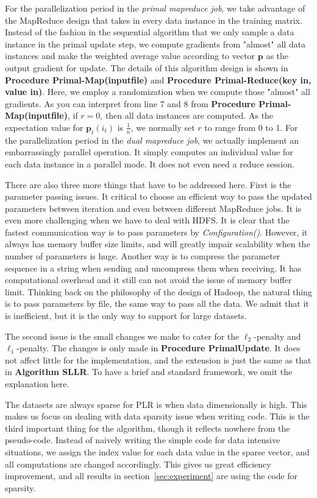 \documentclass{llncs}
\newcommand{\bp}{\mathbf{p}}
\begin{document}
For the parallelization period in the \textit{primal mapreduce job}, we take advantage of the MapReduce design that takes in every data instance in the training matrix.
Instead of the fashion in the sequential algorithm that we only sample a data instance in the primal update step, we compute gradients from "almost" all data instances and make the weighted average value according to vector $\bp$ as the output gradient for update.
The details of this algorithm design is shown in \textbf{Procedure Primal-Map(inputfile)} and \textbf{Procedure Primal-Reduce(key in, value in)}.
Here, we employ a randomization when we compute those "almost" all gradients.
As you can interpret from line 7 and 8 from \textbf{Procedure Primal-Map(inputfile)}, if $r=0$, then all data instances are computed.
As the expectation value for $\bp_t(i_t)$ is $\frac{1}{n}$, we normally set $r$ to range from 0 to 1.
For the parallelization period in the \textit{dual mapreduce job}, we actually implement an embarrassingly parallel operation.
It simply computes an individual value for each data instance in a parallel mode. It does not even need a reduce session.

There are also three more things that have to be addressed here.
First is the parameter passing issues. It critical to choose an efficient way to pass the updated parameters between iteration and even between different MapReduce jobs.
It is even more challenging when we have to deal with HDFS. It is clear that the fastest communication way is to pass parameters by \textit{Configuration()}.
However, it always has memory buffer size limits, and will greatly impair scalability when the number of parameters is huge.
Another way is to compress the parameter sequence in a string when sending and uncompress them when receiving. It has computational overhead and it still can not avoid the issue of memory buffer limit.
Thinking back on the philosophy of the design of Hadoop, the natural thing is to pass parameters by file, the same way to pass all the data.
We admit that it is inefficient, but it is the only way to support for large datasets.

The second issue is the small changes we make to cater for the $\ell_2$-penalty and $\ell_1$-penalty. The changes is only made in \textbf{Procedure PrimalUpdate}.
It does not affect little for the implementation, and the extension is just the same as that in \textbf{Algorithm SLLR}.
To have a brief and standard framework, we omit the explanation here.

The datasets are always sparse for PLR is when data dimensionally is high. This makes us focus on dealing with data sparsity issue when writing code.
This is the third important thing for the algorithm, though it reflects nowhere from the pseudo-code.
Instead of naively writing the simple code for data intensive situations, we assign the index value for each data value in the sparse vector, and all computations are changed accordingly.
This gives us great efficiency improvement, and all results in section~\ref{sec:experiment} are using the code for sparsity.
\end{document}

